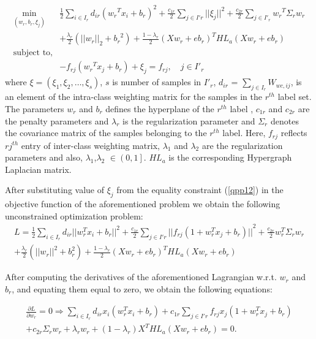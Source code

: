 \documentclass[12pt,a4paper,oneside,english]{report}
\begin{document}
\begin{eqnarray}
 \min_{(w_r,b_r,\xi_j)} & \frac{1}{2}{\displaystyle\sum_{i \in I_r}} d_{ir}\left({w_r}^Tx_i +b_r\right)^2 + \frac{c_{1r}}{2}\sum_{j\in I'r}||\xi_j||^2 + \frac{c_{2r}}{2}{\displaystyle\sum_{j\in I'_r}} {w_r}^T{\Sigma}_r{w_r}\nonumber\\& + \frac{\lambda_r}{2}\left(||w_r||_2 + {b_r}^2\right)  + \frac{1-\lambda_r}{2}\left(Xw_r + eb_r\right)^THL_a\left(Xw_r + eb_r\right)\nonumber\\
  \mbox{subject to,} &\nonumber \\
 & -f_{rj}\left({w_r}^Tx_j + b_r\right) + \xi_j = f_{rj}, \quad j \in I'_r  \label{qpp12}
\end{eqnarray}
where $\xi=(\xi_1,\xi_2,\ldots, \xi_s)$, $s$ is number of samples in $I'_r$, $d_{ir}$ = ${\sum}_{j\in I_r}{W}_{wc,ij}$, is an element of the intra-class weighting matrix for the samples in the $r^{th}$ label set. The parameters $w_r$ and $b_r$ defines the hyperplane of the $r^{th}$ label , $c_{1r}$ and $c_{2r}$ are the penalty parameters and $\lambda_r$ is the regularization parameter and ${\Sigma}_r$ denotes the covariance matrix of the samples belonging to the $r^{th}$ label. Here, $f_{rj}$ reflects ${rj}^{th}$ entry of inter-class weighting matrix, $\lambda_1$ and $\lambda_2$ are the regularization parameters and also,  $\lambda_1 $,$\lambda_2$ $\in\left(0,1\right].$ $HL_a$ is the corresponding Hypergraph Laplacian matrix. 

After substituting value of $\xi_j$ from the equality constraint (\ref{qpp12}) in the objective function of the aforementioned problem we obtain the following unconstrained optimization problem:
\begin{eqnarray}
L =  \frac{1}{2}\sum_{i \in I_r}d_{ir}||w_r^Tx_i + b_r||^2 + \frac{c_{1r}}{2}\sum_{j\in I'r} 
{||f_{rj}\left(1 + w_r^Tx_j +b_r\right)||}^2  +  \frac{c_{2r}}{2}w_r^T\Sigma_rw_r \nonumber\\ +  \frac{\lambda_r}{2}\left(||w_r||^2+ b_r^2\right)  +   \frac{1-\lambda_r}{2}\left(Xw_r + eb_r\right)^THL_a\left(Xw_r + eb_r\right)      \label{qpp13}
\end{eqnarray}

After computing the derivatives of the aforementioned Lagrangian w.r.t. $w_r$ and $b_r$, and equating them equal to zero, we obtain the following equations:

\begin{eqnarray}
\frac{\partial L}{\partial w_r} =0 
\Rightarrow  \displaystyle\sum_{i \in I_r} d_{ir}x_i\left({w}^T_{r}x_i +  b_r\right) + c_{1r}\sum_{j\in I'r}f_{rj}x_j\left(1 + w_r^Tx_j +b_r\right)   \nonumber  \\+ c_{2r}\Sigma_{r}w_r + \lambda_{r}w_r +\left(1-\lambda_{r}\right)X^THL_a\left(Xw_r + eb_r\right)=0. \label{qpp14}  
\end{eqnarray}  
\end{document}
